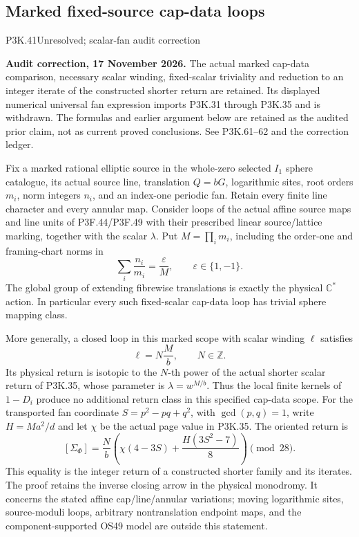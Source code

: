 \subsection{Marked fixed-source cap-data loops}
\begin{statement}{P3K.41}{Unresolved; scalar-fan audit correction}
\par\noindent\textbf{Audit correction, 17 November 2026.} The actual marked cap-data comparison, necessary scalar winding, fixed-scalar triviality and reduction to an integer iterate of the constructed shorter return are retained. Its displayed numerical universal fan expression imports P3K.31 through P3K.35 and is withdrawn. The formulas and earlier argument below are retained as the audited prior claim, not as current proved conclusions. See P3K.61--62 and the correction ledger.
\medskip


Fix a marked rational elliptic source in the whole-zero selected
\(I_1\) sphere catalogue, its actual source line, translation
\(Q=bG\), logarithmic sites, root orders \(m_i\), norm integers
\(n_i\), and an index-one periodic fan. Retain every finite line
character and every annular map. Consider loops of the actual affine
source maps and line units of P3F.44/P3F.49 with their prescribed
linear source/lattice marking, together with the scalar \(\lambda\).
Put \(M=\prod_i m_i\), including the order-one and framing-chart
norms in
\[
           \sum_i\frac{n_i}{m_i}=\frac{\varepsilon}{M},
                \qquad\varepsilon\in\{1,-1\}.
\]
The global group of extending fibrewise translations is exactly
the physical \(\mathbb C^*\) action. In particular every such
fixed-scalar cap-data loop has trivial sphere mapping class.

More generally, a closed loop in this marked scope with scalar
winding \(\ell\) satisfies
\[
                       \ell=N\frac{M}{b},\qquad N\in\mathbb Z.
\]
Its physical return is isotopic to the \(N\)-th power of the
actual shorter scalar return of P3K.35, whose parameter is
\(\lambda=w^{M/b}\). Thus the local finite kernels of \(1-D_i\)
produce no additional return class in this specified cap-data scope.
For the transported fan coordinate \(S=p^2-pq+q^2\), with
\(\gcd(p,q)=1\), write \(H=Ma^2/d\) and let \(\chi\) be the
actual page value in P3K.35. The oriented return is
\[
 [\Sigma_\Phi]
 =\frac{N}{b}\left(\chi(4-3S)+\frac{H(3S^2-7)}8\right)
                         \pmod{28}.
\]
This equality is the integer return of a constructed shorter family
and its iterates. The proof retains the inverse closing arrow in the
physical monodromy. It concerns the stated affine cap/line/annular
variations; moving logarithmic sites, source-moduli loops, arbitrary
nontranslation endpoint maps, and the component-supported OS49
model are outside this statement.

\end{statement}
